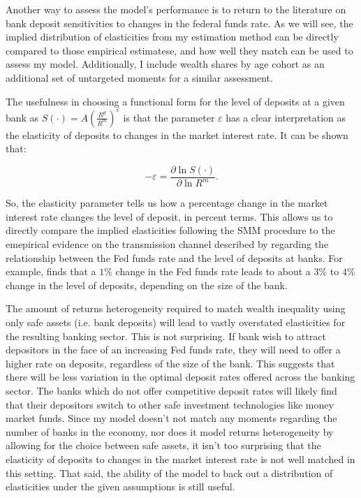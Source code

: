     \par Another way to assess the model's performance is to return to the literature on bank deposit sensitivities to changes in the federal funds rate. As we will see, the implied distribution of elasticities from my estimation method can be directly compared to those empirical estimatese, and how well they match can be used to assess my model. Additionally, I include wealth shares by age cohort as an additional set of untargeted moments for a similar assessment.  

\par The usefulness in choosing a functional form for the level of deposits at a given bank as $S(\cdot) = A \left( \frac{R^d}{R^m} \right)^{\varepsilon}$ is that the parameter $\varepsilon$ has a clear interpretation as the elasticity of deposits to changes in the market interest rate. It can be shown that:

\[
-\varepsilon = \frac{\partial \ln S(\cdot)}{\partial \ln R^m}. 
\]

\par So, the elasticity parameter tells us how a percentage change in the market interest rate changes the level of deposit, in percent terms. This allows us to directly compare the implied elasticities following the SMM procedure to the emepirical evidence on the transmission channel described by \cite{Drechsler2017} regarding the relationship between the Fed funds rate and the level of deposits at banks. For example, \cite{Genay2004} finds that a $1\%$ change in the Fed funds rate leads to about a  $3\%$ to  $4\%$ change in the level of deposits, depending on the size of the bank.

\par The amount of returns heterogeneity required to match wealth inequality using only safe assets (i.e. bank deposits) will lead to vastly overstated elasticities for the resulting banking sector. This is not surprising. If bank wish to attract depositors in the face of an increasing Fed funds rate, they will need to offer a higher rate on deposits, regardless of the size of the bank. This suggests that there will be less variation in the optimal deposit rates offered across the banking sector. The banks which do not offer competitive deposit rates will likely find that their depositors switch to other safe investment technologies like money market funds. Since my model doesn't not match any moments regarding the number of banks in the economy, nor does it model returns heterogeneity by allowing for the choice between safe assets, it isn't too surprising that the elasticity of deposits to changes in the market interest rate is not well matched in this setting. That said, the ability of the model to back out a distribution of elasticities under the given assumptions is still useful. 
